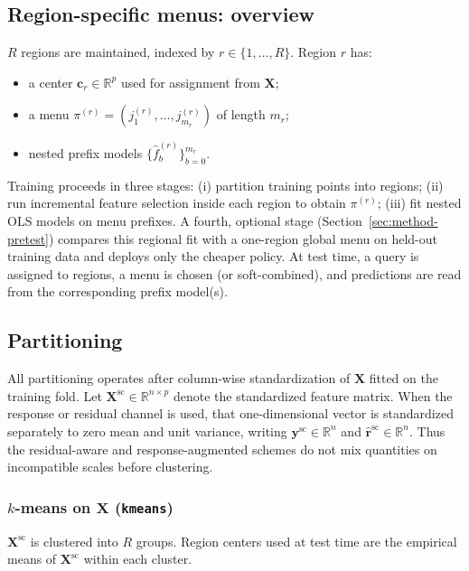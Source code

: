 \documentclass[pdflatex,sn-basic,Numbered]{sn-jnl}
\begin{document}
\subsection{Region-specific menus: overview}

\(R\) regions are maintained, indexed by \(r\in\{1,\ldots,R\}\). Region \(r\) has:
\begin{itemize}
  \item a center \(\mathbf{c}_r\in\mathbb{R}^p\) used for assignment from \(\mathbf{X}\);
  \item a menu \(\pi^{(r)}=(j^{(r)}_1,\ldots,j^{(r)}_{m_r})\) of length \(m_r\);
  \item nested prefix models \(\{\hat f^{(r)}_b\}_{b=0}^{m_r}\).
\end{itemize}

Training proceeds in three stages: (i) partition training points into regions; (ii) run incremental feature selection inside each region to obtain \(\pi^{(r)}\); (iii) fit nested OLS models on menu prefixes. A fourth, optional stage (Section~\ref{sec:method-pretest}) compares this regional fit with a one-region global menu on held-out training data and deploys only the cheaper policy. At test time, a query is assigned to regions, a menu is chosen (or soft-combined), and predictions are read from the corresponding prefix model(s).

\subsection{Partitioning}

All partitioning operates after column-wise standardization of \(\mathbf{X}\) fitted on the training fold. Let \(\mathbf{X}^{\mathrm{sc}}\in\mathbb{R}^{n\times p}\) denote the standardized feature matrix. When the response or residual channel is used, that one-dimensional vector is standardized separately to zero mean and unit variance, writing \(\mathbf{y}^{\mathrm{sc}}\in\mathbb{R}^n\) and \(\hat{\mathbf{r}}^{\mathrm{sc}}\in\mathbb{R}^n\). Thus the residual-aware and response-augmented schemes do not mix quantities on incompatible scales before clustering.

\subsubsection{\texorpdfstring{\(k\)}{k}-means on \texorpdfstring{\(\mathbf{X}\)}{X} (\texttt{kmeans})}
\(\mathbf{X}^{\mathrm{sc}}\) is clustered into \(R\) groups. Region centers used at test time are the empirical means of \(\mathbf{X}^{\mathrm{sc}}\) within each cluster.
\end{document}

